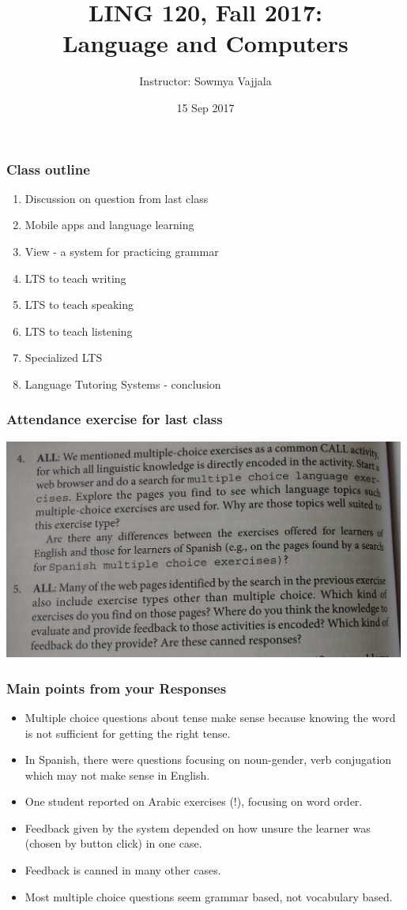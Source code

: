 \documentclass{beamer}
\author[Sowmya Vajjala]{Instructor: Sowmya Vajjala}
\title[LING 120]{LING 120, Fall 2017: \\ Language and Computers}
\date{15 Sep 2017}
\institute{Iowa State University, USA}
\begin{document}
\begin{frame}\titlepage
\end{frame}

\begin{frame}
\frametitle{Class outline}%
\begin{enumerate}
\item Discussion on question from last class
\item Mobile apps and language learning %
\item View - a system for practicing grammar %
\item LTS to teach writing %
\item LTS to teach speaking 
\item LTS to teach listening %
\item Specialized LTS %
\item Language Tutoring Systems - conclusion  %
\end{enumerate}
\end{frame}

\begin{frame} %
\frametitle{Attendance exercise for last class} 
\includegraphics[width=0.99\textwidth]{13SepExercise.jpg}
\end{frame}

\begin{frame}
\frametitle{Main points from your Responses}
\begin{itemize}
\item Multiple choice questions about tense make sense because knowing the word is not sufficient for getting the right tense.
\item In Spanish, there were questions focusing on noun-gender, verb conjugation which may not make sense in English. 
\item One student reported on Arabic exercises (!), focusing on word order. 
\item Feedback given by the system depended on how unsure the learner was (chosen by button click) in one case. 
\item Feedback is canned in many other cases. 
\item Most multiple choice questions seem grammar based, not vocabulary based. 
\end{itemize}
\end{frame}
\end{document}

